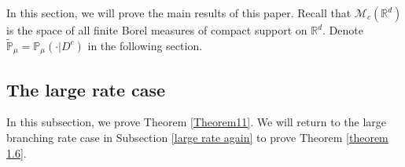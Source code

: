 \documentclass[12pt,a4paper]{amsart}
\theoremstyle{plain}
\theoremstyle{definition}
\numberwithin{equation}{section}
\begin{document}
In this section, we will prove the main results of this paper. Recall that $\mathcal{M}_c(\mathbb{R}^d)$ is the space of all finite Borel measures of compact support on $\mathbb{R}^d$. Denote  $\mathbb{\tilde{P}}_{\mu}=\mathbb{P}_{\mu}(\cdot|D^c)$ in the following section.

\subsection{The large rate case}

In this subsection, we prove Theorem \ref{Theorem11}. 
We will return to the large branching rate case 
in Subsection \ref{large rate again} to prove Theorem \ref{theorem 1.6}.
\end{document}
